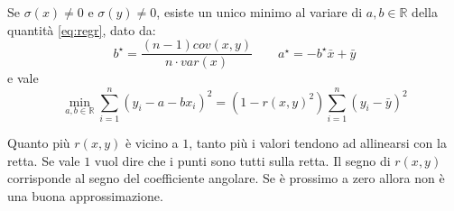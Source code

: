 \begin{theorem}
	Se $\sigma(x) \neq 0$ e $\sigma(y) \neq 0$, esiste un unico minimo al variare di $a,b \in \mathbb{R}$ della quantità \ref{eq:regr}, dato da:
	\begin{equation}
		b^\star = \frac{(n-1)cov(x,y)}{n \cdot var(x)} \quad\quad a^\star = -b^\star \bar{x} + \bar{y}
	\end{equation}
	e vale
	\begin{equation}
		\min_{a,b \in \mathbb{R}} \sum_{i=1}^{n}(y_i-a-bx_i)^2 = (1-r(x,y)^2)\sum_{i=1}^{n}(y_i - \bar{y})^2
	\end{equation}
\end{theorem}
Quanto più $r(x,y)$ è vicino a $1$, tanto più i valori tendono ad allinearsi con la retta. Se vale $1$ vuol dire che i punti sono tutti sulla retta. Il segno di $r(x,y)$ corrisponde al segno del coefficiente angolare. Se è prossimo a zero allora non è una buona approssimazione.
